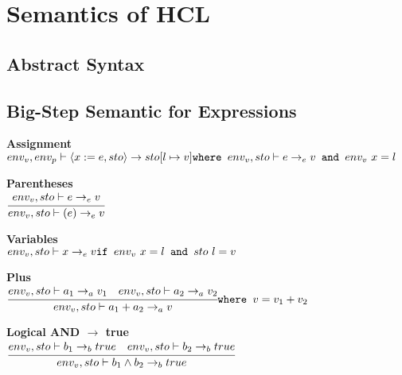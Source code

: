 
\section{Semantics of HCL}

\subsection{Abstract Syntax}

\subsection{Big-Step Semantic for Expressions}
\textbf{Assignment}\\
\begin{math}
	env_v, env_p \vdash \langle x := e, sto \rangle \rightarrow sto[l \mapsto v]\\
	\texttt{where } env_v, sto \vdash e \rightarrow_e v
	\texttt{ and } env_v \ x = l
\end{math}

\textbf{Parentheses}\\
\begin{math}
	\cfrac{env_v, sto \vdash e \rightarrow_e v}
	{env_v, sto \vdash (e) \rightarrow_e v}
\end{math}

\textbf{Variables}\\
\begin{math}
	env_v, sto \vdash x \rightarrow_e v\\
	\texttt{if } env_v \ x = l
	\texttt{ and } sto \ l = v
\end{math}

\textbf{Plus}\\
\begin{math}
	\cfrac{env_v, sto \vdash a_1 \rightarrow_a v_1 \quad env_v, sto \vdash a_2 \rightarrow_a v_2}
	{env_v, sto \vdash a_1 + a_2 \rightarrow_a v}\\
	\texttt{where } v = v_1 + v_2
\end{math}

\textbf{Logical AND $\rightarrow$ true}\\
\begin{math}
	\cfrac{env_v, sto \vdash b_1 \rightarrow_b true \quad env_v, sto \vdash b_2 \rightarrow_b true}
	{env_v, sto \vdash b_1 \wedge b_2 \rightarrow_b true}
\end{math}

